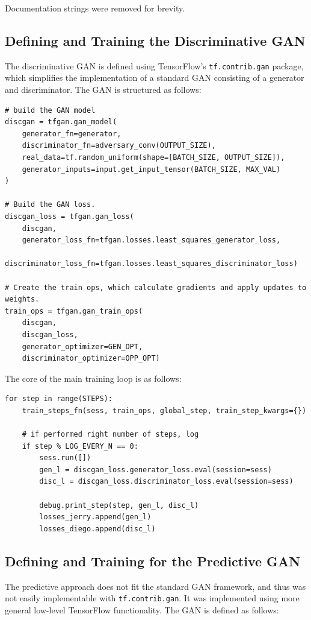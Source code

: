 \documentclass[12pt, titlepage]{report}
\theoremstyle{definition}
\begin{document}
Documentation strings were removed for brevity.



\subsection{Defining and Training the Discriminative GAN}\label{subsection:training_disc}
The discriminative GAN is defined using TensorFlow's \texttt{tf.contrib.gan} package, which simplifies the implementation of a standard GAN consisting of a generator and discriminator. The GAN is structured as follows:

\begin{verbatim}
# build the GAN model
discgan = tfgan.gan_model(
    generator_fn=generator,
    discriminator_fn=adversary_conv(OUTPUT_SIZE),
    real_data=tf.random_uniform(shape=[BATCH_SIZE, OUTPUT_SIZE]),
    generator_inputs=input.get_input_tensor(BATCH_SIZE, MAX_VAL)
)

# Build the GAN loss.
discgan_loss = tfgan.gan_loss(
    discgan,
    generator_loss_fn=tfgan.losses.least_squares_generator_loss,
    discriminator_loss_fn=tfgan.losses.least_squares_discriminator_loss)

# Create the train ops, which calculate gradients and apply updates to weights.
train_ops = tfgan.gan_train_ops(
    discgan,
    discgan_loss,
    generator_optimizer=GEN_OPT,
    discriminator_optimizer=OPP_OPT)
\end{verbatim}

The core of the main training loop is as follows:

\begin{verbatim}
for step in range(STEPS):
    train_steps_fn(sess, train_ops, global_step, train_step_kwargs={})

    # if performed right number of steps, log
    if step % LOG_EVERY_N == 0:
        sess.run([])
        gen_l = discgan_loss.generator_loss.eval(session=sess)
        disc_l = discgan_loss.discriminator_loss.eval(session=sess)

        debug.print_step(step, gen_l, disc_l)
        losses_jerry.append(gen_l)
        losses_diego.append(disc_l)
\end{verbatim}

\subsection{Defining and Training for the Predictive GAN}\label{subsection:training_pred}
The predictive approach does not fit the standard GAN framework, and thus was not easily implementable with \texttt{tf.contrib.gan}. It was implemented using more general low-level TensorFlow functionality. The GAN is defined as follows:
\end{document}
